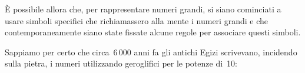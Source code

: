 È possibile allora che, per rappresentare numeri grandi, si siano cominciati 
a usare simboli specifici che richiamassero alla mente i numeri grandi e 
che contemporaneamente siano state fissate alcune regole per associare 
questi simboli.

Sappiamo per certo che circa~6\,000 anni fa gli antichi Egizi scrivevano, 
incidendo sulla pietra, i numeri utilizzando geroglifici per le potenze 
di~10:

% 
% 
% 

